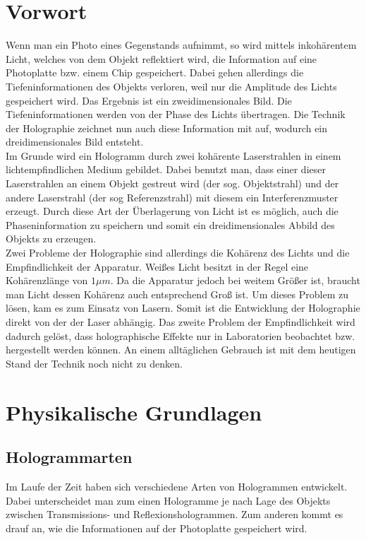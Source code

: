 \section{Vorwort}
Wenn man ein Photo eines Gegenstands aufnimmt, so wird mittels inkohärentem Licht, welches von dem Objekt reflektiert wird, die Information auf eine Photoplatte bzw. einem Chip gespeichert. Dabei gehen allerdings die Tiefeninformationen des Objekts verloren, weil nur die Amplitude des Lichts gespeichert wird. Das Ergebnis ist ein zweidimensionales Bild. Die Tiefeninformationen werden von der Phase des Lichts übertragen. Die Technik der Holographie zeichnet nun auch diese Information mit auf, wodurch ein dreidimensionales Bild entsteht.\\

Im Grunde wird ein Hologramm durch zwei kohärente Laserstrahlen in einem lichtempfindlichen Medium gebildet. Dabei benutzt man, dass einer dieser Laserstrahlen an einem Objekt gestreut wird (der sog. Objektstrahl) und der andere Laserstrahl (der sog Referenzstrahl) mit diesem ein Interferenzmuster erzeugt. Durch diese Art der Überlagerung von Licht ist es möglich, auch die Phaseninformation zu speichern und somit ein dreidimensionales Abbild des Objekts zu erzeugen.\\

Zwei Probleme der Holographie sind allerdings die Kohärenz des Lichts und die Empfindlichkeit der Apparatur. Weißes Licht besitzt in der Regel eine Kohärenzlänge von $1\mu m$. Da die Apparatur jedoch bei weitem Größer ist, braucht man Licht dessen Kohärenz auch entsprechend Groß ist. Um dieses Problem zu lösen, kam es zum Einsatz von Lasern. Somit ist die Entwicklung der Holographie direkt von der der Laser abhängig.
Das zweite Problem der Empfindlichkeit wird dadurch gelöst, dass holographische Effekte nur in Laboratorien beobachtet bzw. hergestellt werden können. An einem alltäglichen Gebrauch ist mit dem heutigen Stand der Technik noch nicht zu denken.

\section{Physikalische Grundlagen}

\subsection{Hologrammarten}
Im Laufe der Zeit haben sich verschiedene Arten von Hologrammen entwickelt. Dabei unterscheidet man zum einen Hologramme je nach Lage des Objekts zwischen Transmissions- und Reflexionshologrammen. Zum anderen kommt es drauf an, wie die Informationen auf der Photoplatte gespeichert wird.\\

